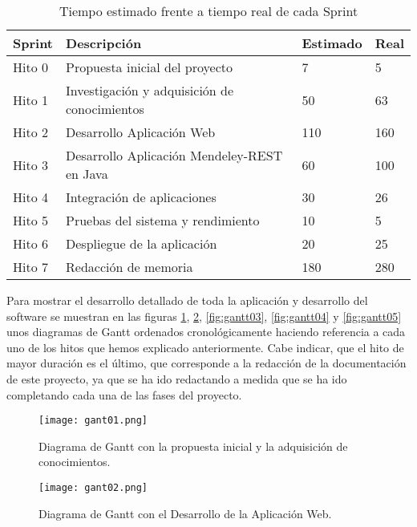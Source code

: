 \begin{table}[!hbt]
	\begin{center}
		\begin{tabular}{|p{2cm}|p{6cm}|p{2.5cm}|p{2.5cm}|}
			\hline
			\textbf{Sprint} & \textbf{Descripción} & \textbf{Estimado} & \textbf{Real}\\
			\hline
			Hito 0 & Propuesta inicial del proyecto & 7 & 5\\
			\hline
			Hito 1 & Investigación y adquisición de conocimientos & 50 & 63\\
			\hline
			Hito 2 & Desarrollo Aplicación Web & 110 & 160\\
			\hline
			Hito 3 & Desarrollo Aplicación Mendeley-REST en Java & 60 & 100\\
			\hline
			Hito 4 & Integración de aplicaciones & 30 & 26\\
			\hline
			Hito 5 & Pruebas del sistema y rendimiento & 10 & 5\\
			\hline
			Hito 6 & Despliegue de la aplicación & 20 & 25\\
			\hline
			Hito 7 & Redacción de memoria & 180 & 280\\
			\hline
		\end{tabular}
		\caption{Tiempo estimado frente a tiempo real de cada Sprint}
		\label{tabla:hitos}
	\end{center}
\end{table}

Para mostrar el desarrollo detallado de toda la aplicación y desarrollo del software se muestran en las figuras \ref{fig:gantt01}, \ref{fig:gantt02}, \ref{fig:gantt03}, \ref{fig:gantt04} y \ref{fig:gantt05} unos diagramas de Gantt ordenados cronológicamente haciendo referencia a cada uno de los hitos que hemos explicado anteriormente. Cabe indicar, que el hito de mayor duración es el último, que corresponde a la redacción de la documentación de este proyecto, ya que se ha ido redactando a medida que se ha ido completando cada una de las fases del proyecto.\\

\begin{figure}[h!]
	\begin{center}
		\texttt{[image: gant01.png]}
		\caption{Diagrama de Gantt con la propuesta inicial y la adquisición de conocimientos.}
		\label{fig:gantt01}
	\end{center}
\end{figure}

\begin{figure}[h!]
	\begin{center}
		\texttt{[image: gant02.png]}
		\caption{Diagrama de Gantt con el Desarrollo de la Aplicación Web.}
		\label{fig:gantt02}
	\end{center}
\end{figure}


